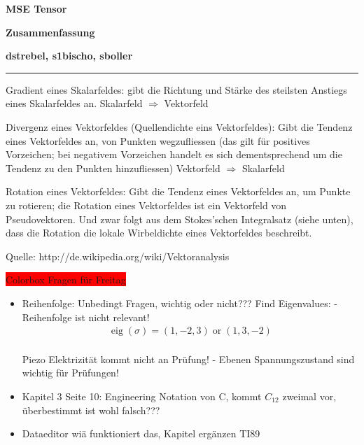 \documentclass[a4paper]{scrartcl}
\begin{document}
\pagestyle{fancy}
\fancyhf{} 
\fancyfoot[C]{\thepage} %
\renewcommand{\headrulewidth}{0pt}
\renewcommand{\footrulewidth}{0.5pt}

 \centerline{\LARGE \bf \textsf{MSE Tensor}} 
 \smallskip
\centerline{\Large \bf \textsf {Zusammenfassung}}
\medskip
  \centerline{\bf \textsf{dstrebel, s1bischo, sboller }}

 \smallskip \noindent\rule{\textwidth}{0.5pt}
\smallskip%




Gradient eines Skalarfeldes: gibt die Richtung und Stärke des steilsten Anstiegs
eines Skalarfeldes an.
Skalarfeld $\Rightarrow$ Vektorfeld

Divergenz eines Vektorfeldes (Quellendichte eins Vektorfeldes): Gibt die Tendenz
eines Vektorfeldes an, von Punkten wegzufliessen (das gilt für positives
Vorzeichen; bei negativem Vorzeichen handelt es sich dementsprechend um die
Tendenz zu den Punkten hinzufliessen) Vektorfeld $\Rightarrow$ Skalarfeld

Rotation eines Vektorfeldes: Gibt die Tendenz eines Vektorfeldes an, um Punkte
zu rotieren; die Rotation eines Vektorfeldes ist ein Vektorfeld von
Pseudovektoren. Und zwar folgt aus dem Stokes’schen Integralsatz (siehe unten),
dass die Rotation die lokale Wirbeldichte eines Vektorfeldes beschreibt.

Quelle: http://de.wikipedia.org/wiki/Vektoranalysis


\colorbox{red}{Colorbox Fragen für Freitag}
\begin{itemize}
	\item Reihenfolge: Unbedingt Fragen, wichtig oder nicht???
Find Eigenvalues: - Reihenfolge ist nicht relevant!
\begin{align}
\operatorname{eig}(\sigma)=\left(1,-2, 3\right) \operatorname{or}
\left(1,3,-2\right)
\end{align}\\

Piezo Elektrizität kommt nicht an Prüfung!
- Ebenen Spannungszustand sind wichtig für Prüfungen!

	\item Kapitel 3 Seite 10: Engineering Notation von C, kommt $C_12$ zweimal vor,
	überbestimmt ist wohl falsch???
	\item Dataeditor wiä funktioniert das, Kapitel ergänzen TI89

\end{itemize}
\end{document}
